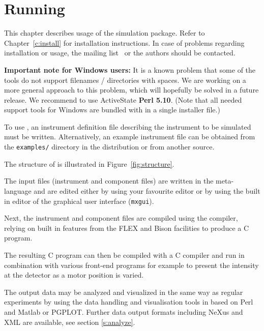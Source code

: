 
\chapter{Running \MCX}
\label{c:running}
This chapter describes usage of the \MCX simulation package. Refer
to Chapter~\ref{c:install} for installation instructions. In case of
problems regarding installation or usage, the \MCX mailing
list~\cite{mcxtrace_webpage} or the authors should be contacted.

{\bfseries Important note for Windows users:} It is a known problem that some of
the \MCX tools do not support filenames / directories with spaces.
We are working on a more general approach to this problem, which will
hopefully be solved in a future release. We recommend to use
ActiveState {\bfseries Perl 5.10}. (Note that all needed
support tools for Windows are bundled with \MCX in a single installer file.)

To use \MCX, an instrument
definition file describing the instrument to be simulated must be
written. Alternatively, an example instrument file can be obtained
from the \verb+examples/+ directory in the distribution or from
another source.

The structure of \MCX is illustrated in Figure~\ref{fig:structure}.

The input files (instrument and component files) are written in the \MCX
meta-language and are edited either by using your favourite editor
or by using the built in editor of the graphical user interface
(\texttt{mxgui}).

Next, the instrument and component files are compiled using the \MCX
compiler, relying on built in features from the FLEX and Bison facilities to produce a C program.

The resulting C program can then be
compiled with a C compiler and run in combination with various
front-end programs for example to present the intensity at the
detector as a motor position is varied.

The output data may be analyzed and visualized in the same way as
regular experiments by using the data handling and visualisation tools in \MCX based on
Perl and Matlab or PGPLOT. Further data
output formats including NeXus and XML are available, see section \ref{s:analyze}.

%


